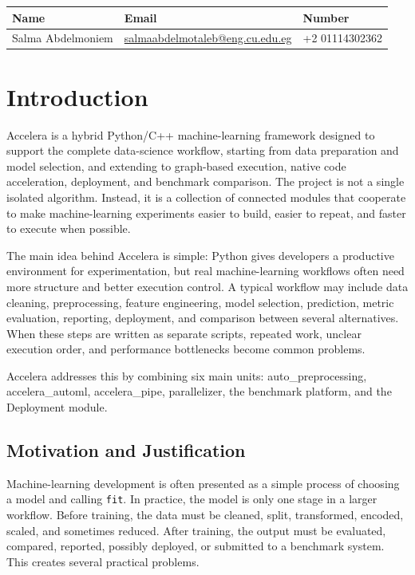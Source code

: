 \documentclass[12pt,a4paper]{report}
\begin{document}
\begin{table}[h!]
\centering
\begin{tabular}{|p{}|p{}|p{}|}
\hline
\textbf{Name} & \textbf{Email} & \textbf{Number} \\ \hline
Salma Abdelmoniem & \underline{salmaabdelmotaleb@eng.cu.edu.eg}  & +2 01114302362 \\ \hline
\end{tabular}
\end{table}


\clearpage


\chapter{Introduction}
\label{chap:introduction}

Accelera is a hybrid Python/C++ machine-learning framework designed to support
the complete data-science workflow, starting from data preparation and model
selection, and extending to graph-based execution, native code acceleration,
deployment, and benchmark comparison. The project is not a single isolated
algorithm. Instead, it is a collection of connected modules that cooperate to
make machine-learning experiments easier to build, easier to repeat, and faster
to execute when possible.

\medskip
\noindent The main idea behind Accelera is simple: Python gives developers a productive
environment for experimentation, but real machine-learning workflows often need
more structure and better execution control. A typical workflow may include data
cleaning, preprocessing, feature engineering, model selection, prediction,
metric evaluation, reporting, deployment, and comparison between several
alternatives. When these steps are written as separate scripts, repeated work,
unclear execution order, and performance bottlenecks become common problems.

Accelera addresses this by combining six main units:
auto\_preprocessing, accelera\_automl,
accelera\_pipe, parallelizer, the benchmark platform, and
the Deployment module.

\section{Motivation and Justification}

Machine-learning development is often presented as a simple process of choosing
a model and calling \texttt{fit}. In practice, the model is only one stage in a
larger workflow. Before training, the data must be cleaned, split, transformed,
encoded, scaled, and sometimes reduced. After training, the output must be
evaluated, compared, reported, possibly deployed, or submitted to a benchmark
system. This creates several practical problems.
\end{document}
